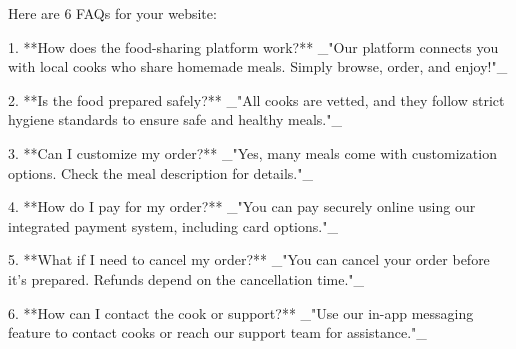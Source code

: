 Here are 6 FAQs for your website:  

1. **How does the food-sharing platform work?**  
   _"Our platform connects you with local cooks who share homemade meals. Simply browse, order, and enjoy!"_  

2. **Is the food prepared safely?**  
   _"All cooks are vetted, and they follow strict hygiene standards to ensure safe and healthy meals."_  

3. **Can I customize my order?**  
   _"Yes, many meals come with customization options. Check the meal description for details."_  

4. **How do I pay for my order?**  
   _"You can pay securely online using our integrated payment system, including card options."_  

5. **What if I need to cancel my order?**  
   _"You can cancel your order before it's prepared. Refunds depend on the cancellation time."_  

6. **How can I contact the cook or support?**  
   _"Use our in-app messaging feature to contact cooks or reach our support team for assistance."_  